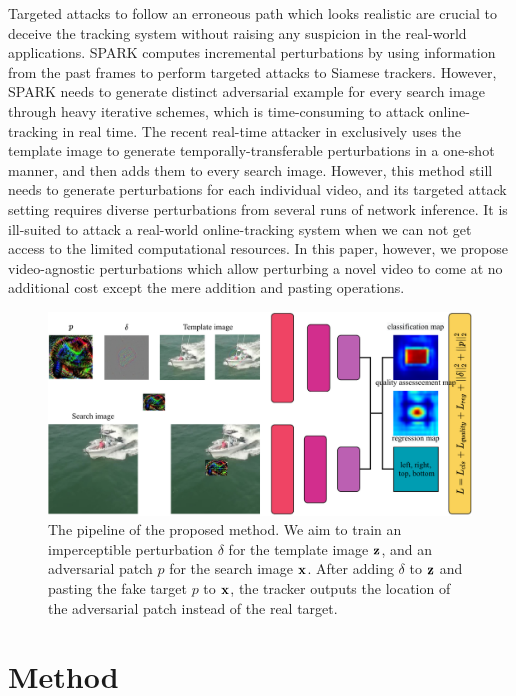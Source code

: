 \documentclass{article}
\begin{document}
Targeted attacks to follow an erroneous path which looks realistic are crucial to deceive the tracking system without raising any suspicion in the real-world applications.
SPARK \cite{SPARK} computes incremental perturbations by using information from the past frames to perform targeted attacks to Siamese trackers. However, SPARK needs to generate distinct adversarial example for every search image through heavy iterative schemes, which is time-consuming to attack online-tracking in real time. The recent real-time attacker in \cite{TTP} exclusively uses the template image to generate temporally-transferable perturbations in a one-shot manner, and then adds them to every search image. However, this method still needs to generate perturbations for each individual video, and its targeted attack setting requires diverse perturbations from several runs of network inference. It is ill-suited to attack a real-world online-tracking system when we can not get access to the limited computational resources. In this paper, however, we propose video-agnostic perturbations which allow perturbing a novel video to come at no additional cost except the mere addition and pasting operations.

\begin{figure}[t]
\centering
\includegraphics[width=1.0\textwidth]{images/network_v3.pdf}
\caption{The pipeline of the proposed method. We aim to train an imperceptible perturbation $\delta$ for the template image $\textbf z$, and an adversarial patch $p$ for the search image $\textbf x$. After adding $\delta$ to $\textbf z$ and pasting the fake target $p$ to $\textbf x$, the tracker outputs the location of the adversarial patch instead of the real target.}
\end{figure}

\section{Method}
\end{document}
